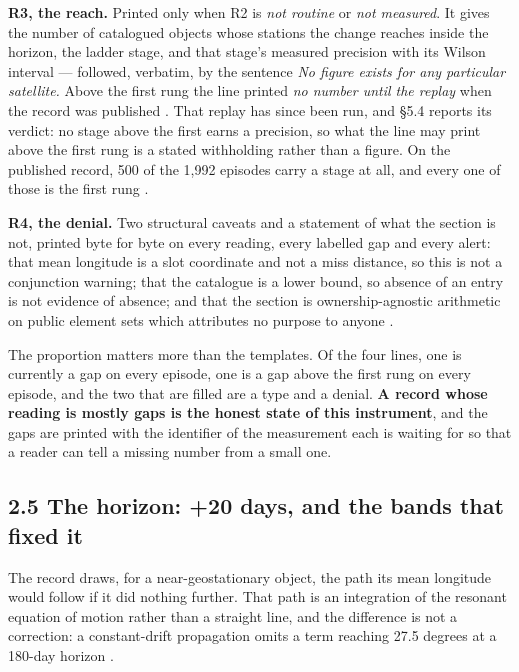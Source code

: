 \documentclass[11pt]{article}
\begin{document}
\textbf{R3, the reach.} Printed only when R2 is \emph{not routine} or \emph{not measured}. It gives the number of catalogued objects whose stations the change reaches inside the horizon, the ladder stage, and that stage's measured precision with its Wilson interval --- followed, verbatim, by the sentence \emph{No figure exists for any particular satellite.} Above the first rung the line printed \emph{no number until the replay} when the record was published%
. That replay has since been run, and \S{}5.4 reports its verdict: no stage above the first earns a precision, so what the line may print above the first rung is a stated withholding rather than a figure. On the published record, 500 of the 1,992 episodes carry a stage at all, and every one of those is the first rung%
.

\textbf{R4, the denial.} Two structural caveats and a statement of what the section is not, printed byte for byte on every reading, every labelled gap and every alert: that mean longitude is a slot coordinate and not a miss distance, so this is not a conjunction warning; that the catalogue is a lower bound, so absence of an entry is not evidence of absence; and that the section is ownership-agnostic arithmetic on public element sets which attributes no purpose to anyone%
.

The proportion matters more than the templates. Of the four lines, one is currently a gap on every episode, one is a gap above the first rung on every episode, and the two that are filled are a type and a denial. \textbf{A record whose reading is mostly gaps is the honest state of this instrument}, and the gaps are printed with the identifier of the measurement each is waiting for so that a reader can tell a missing number from a small one.

\subsection*{2.5 The horizon: +20 days, and the bands that fixed it}

The record draws, for a near-geostationary object, the path its mean longitude would follow if it did nothing further. That path is an integration of the resonant equation of motion rather than a straight line, and the difference is not a correction: a constant-drift propagation omits a term reaching 27.5 degrees at a 180-day horizon%
.
\end{document}

